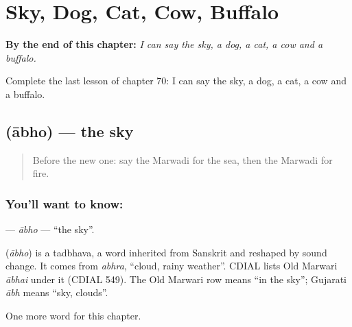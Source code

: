 
\chapter{Sky, Dog, Cat, Cow, Buffalo}
\label{ch:mw-sky-dog-cat-cow-buffalo}

\begin{chapteropening}
\textbf{By the end of this chapter:} \emph{I can say the sky, a dog, a cat, a cow and a buffalo.}

Complete the last lesson of chapter 70: I can say the sky, a dog, a cat, a cow and a buffalo.
\end{chapteropening}

\section[\texorpdfstring{\mw{आभो} (ābho)}{आभो (ābho)}]{ (ābho) — the sky}

\label{lesson:MW-C70-abho}



\begin{quote}
Before the new one: say the Marwadi for the sea, then the Marwadi for fire.
\end{quote}

\subsection*{You'll want to know: }
\textbf{} — \emph{ābho} — \textquotedblleft{}the sky\textquotedblright{}.

\begin{cousinweb}
\textbf{} (\emph{ābho}) is a tadbhava, a word inherited from Sanskrit and reshaped by sound change. It comes from \emph{abhra}, \textquotedblleft{}cloud, rainy weather\textquotedblright{}. CDIAL lists Old Marwari \emph{ābhai} under it (CDIAL 549). The Old Marwari row means \textquotedblleft{}in the sky\textquotedblright{}; Gujarati \emph{ābh} means \textquotedblleft{}sky, clouds\textquotedblright{}.
\end{cousinweb}

\begin{grammarlens}[title={What you've built}]
One more word for this chapter.
\end{grammarlens}

